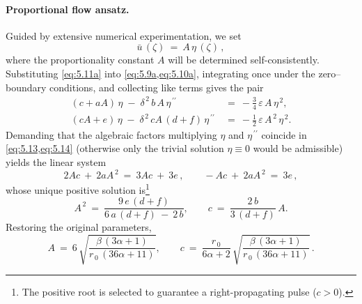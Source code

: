 \documentclass[alpha-refs, 12pt]{wiley-article}
\newcommand{\eps}{\varepsilon}
\begin{document}
\paragraph{Proportional flow ansatz.} Guided by extensive numerical experimentation, we set
\begin{equation}\label{eq:5.11a}
  \bar{u}\,(\zeta)\ =\ A\,\eta\,(\zeta)\,,
\end{equation}
where the proportionality constant $A$ will be determined self-consistently. Substituting \cref{eq:5.11a} into \cref{eq:5.9a,eq:5.10a}, integrating once under the zero–boundary conditions, and collecting like terms gives the pair
\begin{align}
  (c+aA)\,\eta \;-\;\delta^{\,2}\,b\,A\,\eta^{\,\prime\prime}\ &=\ -\frac{3}{4}\,\eps\,A\,\eta^{\,2}, \label{eq:5.13} \\
  (cA+e)\,\eta \;-\;\delta^{\,2}\,cA\,(d+f)\,\eta^{\,\prime\prime}\ &=\ -\frac{1}{2}\,\eps\,A^{\,2}\,\eta^{\,2}. \label{eq:5.14}
\end{align}
Demanding that the algebraic factors multiplying $\eta$ and $\eta^{\,\prime\prime}$ coincide in \cref{eq:5.13,eq:5.14} (otherwise only the trivial solution $\eta\equiv0$ would be admissible) yields the linear system
\begin{equation}\label{eq:compat}
  2Ac\ +\ 2aA^{\,2}\ =\ 3Ac\ +\ 3e\,, \qquad -Ac\ +\ 2aA^{\,2}\ =\ 3e\,,
\end{equation}
whose unique positive solution is\footnote{The positive root is selected to guarantee a right-propagating pulse ($c>0$).}
\begin{equation*}
  A^{\,2}\ =\ \frac{9\,e\,(d+f)}{6\,a\,(d+f)\ -\ 2\,b}, \qquad c\ =\ \frac{2\,b}{3\,(d+f)}\,A.
\end{equation*}
Restoring the original parameters,
\begin{equation*}
  A\ =\ 6\,\sqrt{\frac{\beta\,(3\alpha+1)}{r_{\,0}\,(36\alpha+11)}}, \qquad
  c\ =\ \frac{r_{\,0}}{6\alpha+2}\,\sqrt{\frac{\beta\,(3\alpha+1)}{r_{\,0}\,(36\alpha+11)}}\,.
\end{equation*}
\end{document}
